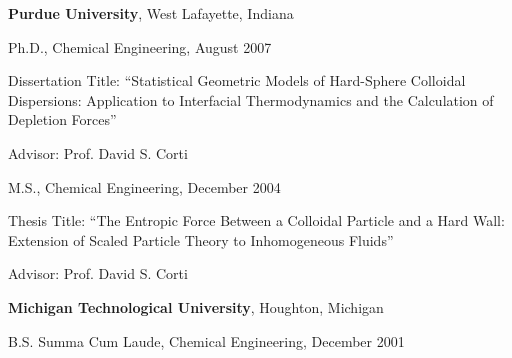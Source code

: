 {\bf Purdue University}, West Lafayette, Indiana\\
\vspace*{-.135in}
\begin{list1}
\item[] Ph.D., Chemical Engineering, August 2007
\begin{list2}
\item Dissertation Title:  ``Statistical Geometric Models of Hard-Sphere Colloidal Dispersions: \newline Application to Interfacial Thermodynamics and the Calculation of Depletion Forces'' 
\item Advisor: Prof. David S. Corti
\end{list2}
\vspace*{.01in}
\item[] M.S., Chemical Engineering,  December 2004
\begin{list2}
\item Thesis Title:  ``The Entropic Force Between a Colloidal Particle and a Hard Wall: \newline Extension of Scaled Particle Theory to Inhomogeneous Fluids''
\item Advisor: Prof. David S. Corti
\end{list2}
\end{list1}

{\bf Michigan Technological University}, Houghton, Michigan\\
\vspace*{-.135in}
\begin{list1}
\item[] B.S. Summa Cum Laude, Chemical Engineering,  December 2001
\end{list1}




